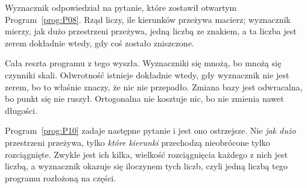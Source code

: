 \begin{fr}
Wyznacznik odpowiedział na pytanie, które zostawił otwartym
Program~\ref{prog:P08}. Rząd liczy, ile kierunków przeżywa macierz; wyznacznik
mierzy, jak dużo przestrzeni przeżywa, jedną liczbą ze znakiem, a ta liczba
jest zerem dokładnie wtedy, gdy coś zostało zniszczone.

Cała reszta programu z tego wyszła. Wyznaczniki się mnożą, bo mnożą się
czynniki skali. Odwrotność istnieje dokładnie wtedy, gdy wyznacznik nie jest
zerem, bo to właśnie znaczy, że nic nie przepadło. Zmiana bazy jest odwracalna,
bo punkt się nie ruszył. Ortogonalna nie kosztuje nic, bo nie zmienia nawet
długości.

Program~\ref{prog:P10} zadaje następne pytanie i jest ono ostrzejsze. Nie
\emph{jak dużo} przestrzeni przeżywa, tylko \emph{które kierunki} przechodzą
nieobrócone \dash{} tylko rozciągnięte. Zwykle jest ich kilka, wielkość
rozciągnięcia każdego z nich jest liczbą, a wyznacznik okazuje się iloczynem
tych liczb, czyli jedną liczbą tego programu rozłożoną na części.
\end{fr}

